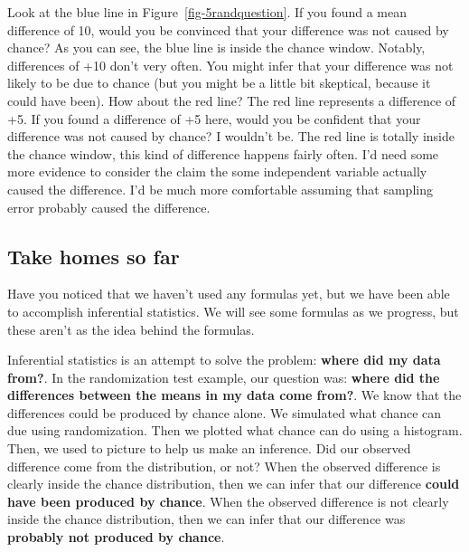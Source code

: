 \documentclass[
  letterpaper,
  DIV=11,
  numbers=noendperiod]{scrreprt}
\begin{document}
Look at the blue line in Figure~\ref{fig-5randquestion}. If you found a
mean difference of 10, would you be convinced that your difference was
not caused by chance? As you can see, the blue line is inside the chance
window. Notably, differences of +10 don't very often. You might infer
that your difference was not likely to be due to chance (but you might
be a little bit skeptical, because it could have been). How about the
red line? The red line represents a difference of +5. If you found a
difference of +5 here, would you be confident that your difference was
not caused by chance? I wouldn't be. The red line is totally inside the
chance window, this kind of difference happens fairly often. I'd need
some more evidence to consider the claim the some independent variable
actually caused the difference. I'd be much more comfortable assuming
that sampling error probably caused the difference.

\subsection{Take homes so far}\label{take-homes-so-far}

Have you noticed that we haven't used any formulas yet, but we have been
able to accomplish inferential statistics. We will see some formulas as
we progress, but these aren't as the idea behind the formulas.

Inferential statistics is an attempt to solve the problem: \textbf{where
did my data from?}. In the randomization test example, our question was:
\textbf{where did the differences between the means in my data come
from?}. We know that the differences could be produced by chance alone.
We simulated what chance can due using randomization. Then we plotted
what chance can do using a histogram. Then, we used to picture to help
us make an inference. Did our observed difference come from the
distribution, or not? When the observed difference is clearly inside the
chance distribution, then we can infer that our difference \textbf{could
have been produced by chance}. When the observed difference is not
clearly inside the chance distribution, then we can infer that our
difference was \textbf{probably not produced by chance}.
\end{document}
